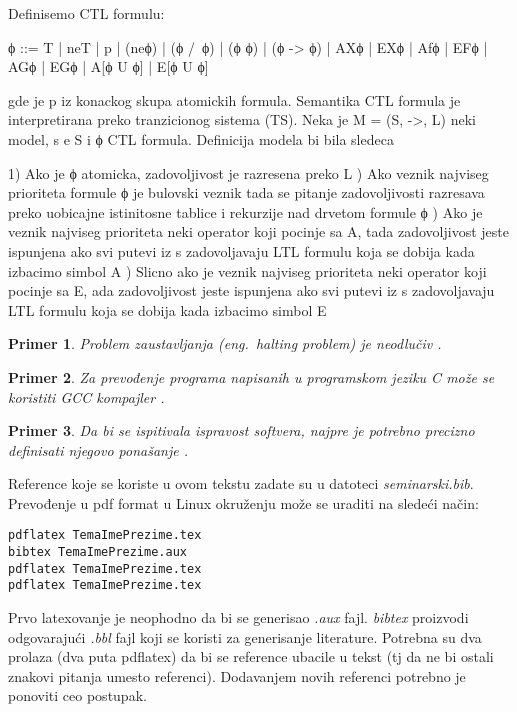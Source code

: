 \documentclass[a4paper]{article}
\newtheorem{primer}{Primer}[section]
\begin{document}
Definisemo CTL formulu:

ϕ ::= T | neT | p | (neϕ) | (ϕ /\ ϕ) | (ϕ \/ ϕ) | (ϕ -> ϕ) | AXϕ | EXϕ | Afϕ | EFϕ | AGϕ | EGϕ | A[ϕ U ϕ] | E[ϕ U ϕ]

gde je p iz konackog skupa atomickih formula.
\newline
\newline
Semantika
\newline
\newline
CTL formula je interpretirana preko tranzicionog sistema (TS). Neka je M = (S, ->, L) neki model, s e S i ϕ CTL formula.
Definicija modela bi bila sledeca

	1) Ako je ϕ atomicka, zadovoljivost je razresena preko L ) Ako veznik najviseg prioriteta formule ϕ je bulovski veznik tada se pitanje zadovoljivosti razresava
	   preko uobicajne istinitosne tablice i rekurzije nad drvetom formule ϕ ) Ako je veznik najviseg prioriteta neki operator koji pocinje sa A, tada zadovoljivost jeste ispunjena ako
	   svi putevi iz s zadovoljavaju LTL formulu koja se dobija kada izbacimo simbol A ) Slicno ako je veznik najviseg prioriteta neki operator koji pocinje sa E, ada zadovoljivost jeste ispunjena ako
	   svi putevi iz s zadovoljavaju LTL formulu koja se dobija kada izbacimo simbol E \newline

\newpage
\begin{primer}
Problem zaustavljanja (eng.~{\em halting problem}) je neodlučiv \cite{haltingproblem}.
\end{primer}

\begin{primer}
Za prevođenje programa napisanih u programskom jeziku C može se koristiti GCC kompajler \cite{gcc}.
\end{primer}

\begin{primer}
 Da bi se ispitivala ispravost softvera, najpre je potrebno precizno definisati njegovo ponašanje \cite{laski2009software}. 
\end{primer}

Reference koje se koriste u ovom tekstu zadate su u datoteci {\em seminarski.bib}. Prevođenje u pdf format u Linux okruženju može se uraditi na sledeći način:
\begin{verbatim}
pdflatex TemaImePrezime.tex 
bibtex TemaImePrezime.aux 
pdflatex TemaImePrezime.tex 
pdflatex TemaImePrezime.tex 
\end{verbatim}
Prvo latexovanje je neophodno da bi se generisao {\em .aux} fajl. {\em bibtex} proizvodi odgovarajući {\em .bbl} fajl koji se koristi za generisanje literature. 
Potrebna su dva prolaza (dva puta pdflatex) da bi se reference ubacile u tekst (tj da ne bi ostali znakovi pitanja umesto referenci). Dodavanjem novih referenci potrebno je ponoviti ceo postupak.  
\end{document}
